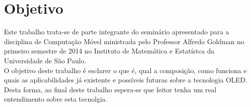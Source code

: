 \section{Objetivo}
\label{sec:objetivo}

Este trabalho trata-se de parte integrante do seminário apresentado para a disciplina de Computação Móvel ministrada pelo Professor Alfredo Goldman no primeiro semestre de 2014 no Instituto de Matemática e Estatístca da Universidade de São Paulo. \\

O objetivo deste trabalho é esclarer o que é, qual a composição, como funciona e quais as aplicabilidades já existente e possíveis futuras sobre a tecnologia OLED. Desta forma, ao final deste trabalho espera-se que leitor tenha um real entendimento sobre esta tecnolgia.


